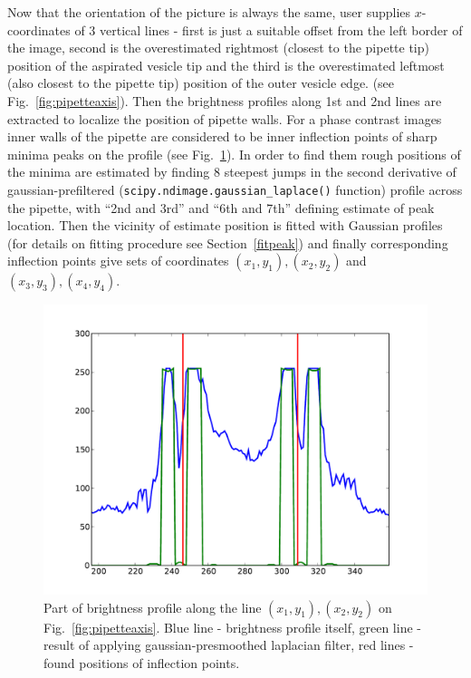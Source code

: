 Now that the orientation of the picture is always the same, user supplies $x$-coordinates of 3 vertical lines - first is just a suitable offset from the left border of the image, second is the overestimated rightmost (closest to the pipette tip) position of the aspirated vesicle tip and the third is the overestimated leftmost (also closest to the pipette tip) position of the outer vesicle edge. (see Fig.~\ref{fig:pipetteaxis}). Then the brightness profiles along 1st and 2nd lines are extracted to localize the position of pipette walls. For a phase contrast images inner walls of the pipette are considered to be inner inflection points of sharp minima peaks on the profile (see Fig.~\ref{fig:pipetteprofile}). In order to find them rough positions of the minima are estimated by finding 8 steepest jumps in the second derivative of gaussian-prefiltered (\verb|scipy.ndimage.gaussian_laplace()| function) profile across the pipette, with ``2nd and 3rd'' and ``6th and 7th'' defining estimate of peak location. Then the vicinity of estimate position is fitted with Gaussian profiles (for details on fitting procedure see Section~\ref{fitpeak}) and finally corresponding inflection points give sets of coordinates $(x_1,y_1), (x_2,y_2)$ and $(x_3,y_3), (x_4,y_4)$.

\begin{figure}%
\includegraphics[width=\columnwidth]{figs/pipetteprofile.pdf}%
\caption{Part of brightness profile along the line $(x_1,y_1), (x_2,y_2)$ on Fig.~\ref{fig:pipetteaxis}. Blue line - brightness profile itself, green line - result of applying gaussian-presmoothed laplacian filter, red lines - found positions of inflection points.}%
\label{fig:pipetteprofile}%
\end{figure}

